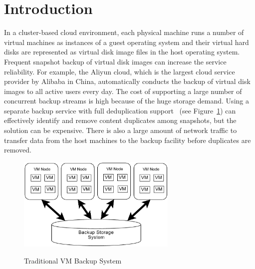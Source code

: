 \section{Introduction}
In a cluster-based cloud environment,
each physical machine runs a number  of virtual machines as  instances of a guest operating system 
and their  virtual hard disks are represented as virtual disk image files in the host operating system.
Frequent  snapshot backup of virtual disk images  can increase  the service reliability. 
For example, the Aliyun cloud, which is  the largest cloud service provider by Alibaba in China, 
automatically conducts  the backup of virtual disk images to all active users every day.
The cost of supporting a large number of concurrent backup streams is high
because of the huge storage demand. 
Using a separate  backup service with full deduplication support~\cite{venti02,bottleneck08}
(see Figure~\ref{fig:traditional-arch})
can effectively identify and remove content duplicates among snapshots, 
but the solution can be expensive. There is also a large amount of 
network traffic to transfer  data from the host machines to the backup facility
before duplicates are removed.

\begin{figure}[htb]
    \centering
    \includegraphics[width=3in]{images/traditional-arch.pdf}
    \label{fig:traditional-arch}
    \caption{Traditional VM Backup System}
\end{figure}


